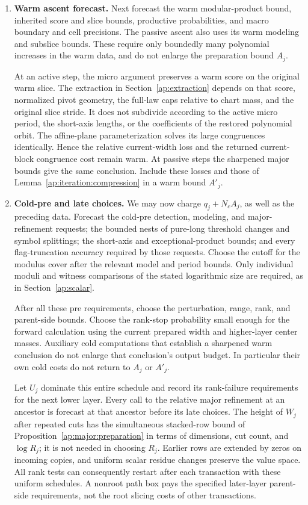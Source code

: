 \begin{enumerate}
\item \textbf{Warm ascent forecast.}
Next forecast the warm modular-product bound, inherited score and slice
bounds, productive probabilities, and macro boundary and cell precisions.
The passive ascent also uses its warm modeling and subslice bounds.
These require only boundedly many polynomial increases in the warm
data, and do not enlarge the preparation bound $A_j$.

At an active step, the micro argument preserves a warm score on the
original warm slice.  The extraction in Section~\ref{ap:extraction}
depends on that score, normalized pivot geometry, the full-law caps
relative to chart mass, and the original slice stride.  It does not
subdivide according to the active micro period, the short-axis lengths,
or the coefficients of the restored polynomial orbit.  The affine-plane
parameterization solves its large congruences identically.  Hence the
relative current-width loss and the returned current-block congruence
cost remain warm.  At passive steps the sharpened major bounds give
the same conclusion.  Include these losses and those of
Lemma~\ref{ap:iteration:compression} in a warm bound $A'_j$.

\item \textbf{Cold-pre and late choices.}
We may now charge $q_j+N_c A_j$, as well as the preceding data.  Forecast
the cold-pre detection, modeling, and major-refinement requests; the
bounded nests of pure-long threshold changes and symbol splittings;
the short-axis and exceptional-product bounds; and every flag-truncation
accuracy required by those requests.  Choose the cutoff for the modulus
cover after the relevant model and period bounds.  Only individual
moduli and witness comparisons of the stated logarithmic size are
required, as in Section~\ref{ap:scalar}.

After all these pre requirements, choose the perturbation, range,
rank, and parent-side bounds.  Choose the rank-stop probability small
enough for the forward calculation using the current prepared width
and higher-layer center masses.  Auxiliary cold computations that
establish a sharpened warm conclusion do not enlarge that conclusion's
output budget.  In particular their own cold costs do not return to
$A_j$ or $A'_j$.

Let $U_j$ dominate this entire schedule and record its rank-failure
requirements for the next lower layer.  Every call to the relative
major refinement at an ancestor is forecast at that ancestor before
its late choices.  The height of $W_j$ after repeated cuts has the
simultaneous stacked-row bound of Proposition~\ref{ap:major:preparation}
in terms of dimensions, cut count, and $\log R_j$; it is not needed in
choosing $R_j$.  Earlier rows are extended
by zeros on incoming copies, and uniform scalar residue changes preserve
the value space.  All rank tests can consequently restart after each
transaction with these uniform schedules.  A nonroot path box pays the
specified later-layer parent-side requirements, not the root slicing
costs of other transactions.
\end{enumerate}

